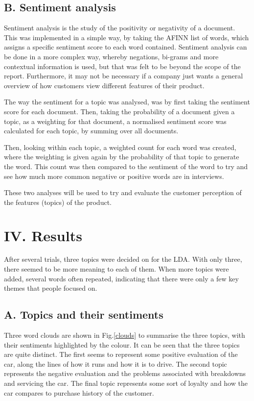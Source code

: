 \documentclass[onecolumn,prl,aps,10pt]{revtex4}
\begin{document}
\subsection{B. Sentiment analysis}

Sentiment analysis is the study of the positivity or negativity of a document. This was implemented in a simple way, by taking the AFINN list of words, which assigns a specific sentiment score to each word contained. Sentiment analysis can be done in a more complex way, whereby negations, bi-grams and more contextual information is used, but that was felt to be beyond the scope of the report. Furthermore, it may not be necessary if a company just wants a general overview of how customers view different features of their product.

The way the sentiment for a topic was analysed, was by first taking the sentiment score for each document. Then, taking the probability of a document given a topic, as a weighting for that document, a normalised sentiment score was calculated for each topic, by summing over all documents.

Then, looking within each topic, a weighted count for each word was created, where the weighting is given again by the probability of that topic to generate the word. This count was then compared to the sentiment of the word to try and see how much more common negative or positive words are in interviews.

These two analyses will be used to try and evaluate the customer perception of the features (topics) of the product.

\section{IV. Results}

After several trials, three topics were decided on for the LDA. With only three, there seemed to be more meaning to each of them. When more topics were added, several words often repeated, indicating that there were only a few key themes that people focused on.

\subsection{A. Topics and their sentiments}

Three word clouds are shown in Fig.\ref{clouds} to summarise the three topics, with their sentiments highlighted by the colour. It can be seen that the three topics are quite distinct. The first seems to represent some positive evaluation of the car, along the lines of how it runs and how it is to drive. The second topic represents the negative evaluation and the problems associated with breakdowns and servicing the car. The final topic represents some sort of loyalty and how the car compares to purchase history of the customer. 
\end{document}
